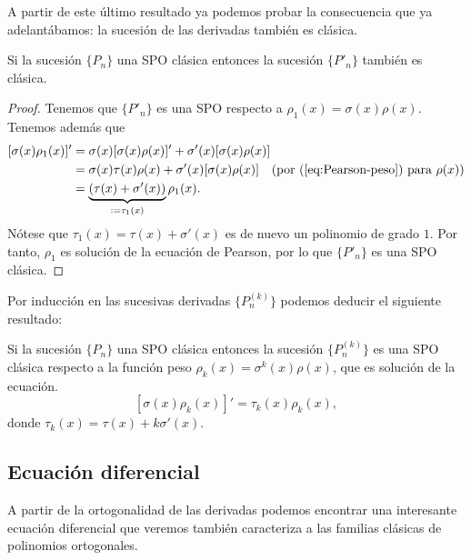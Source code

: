 A partir de este último resultado ya podemos probar la consecuencia que ya adelantábamos: la sucesión de las derivadas también es clásica.

\begin{corolario}
    \label{cor:derivadas-clasicas}
    Si la sucesión $\{P_n\}$ una SPO clásica entonces la sucesión $\{P'_n\}$ también es clásica.
\end{corolario}
\begin{proof}
    Tenemos que $\{P'_n\}$ es una SPO respecto a $\rho_1(x) = \sigma(x)\rho(x)$. Tenemos además que
    \begin{equation*}
        \begin{split}
            [\sigma(x)\rho_1(x)]' &= \sigma(x)[\sigma(x)\rho(x)]'+\sigma'(x)[\sigma(x)\rho(x)] \\
            &= \sigma(x)\tau(x)\rho(x) + \sigma'(x)[\sigma(x)\rho(x)] \  \ \ (\text{por (\ref{eq:Pearson-peso}) para }\rho(x)) \\
            &= \underbrace{(\tau(x)+\sigma'(x))}_{:= \tau_1(x)}\rho_1(x).
        \end{split}
    \end{equation*}
    Nótese que $\tau_1(x)=\tau(x)+\sigma'(x)$ es de nuevo un polinomio de grado $1$. Por tanto, $\rho_1$ es solución de la ecuación de Pearson, por lo que $\{P'_n\}$ es una SPO clásica.
\end{proof}

Por inducción en las sucesivas derivadas $\{P^{(k)}_n\}$ podemos deducir el siguiente resultado:

\begin{corolario}
    Si la sucesión $\{P_n\}$ una SPO clásica entonces la sucesión $\{P^{(k)}_n\}$ es una SPO clásica respecto a la función peso $\rho_k(x)=\sigma^k(x)\rho(x)$, que es solución de la ecuación.
    $$
    [\sigma(x)\rho_k(x)]' = \tau_k(x) \rho_k(x),
    $$
    donde $\tau_k(x)=\tau(x)+k\sigma'(x)$.
\end{corolario}

\subsection{Ecuación diferencial}

A partir de la ortogonalidad de las derivadas podemos encontrar una interesante ecuación diferencial que veremos también caracteriza a las familias clásicas de polinomios ortogonales.

